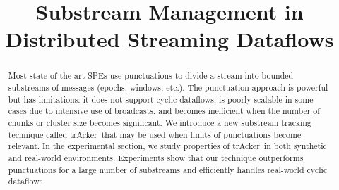 \documentclass[sigconf]{acmart}
\newcommand {\tracker} {trAcker}
\begin{document}
\title {Substream Management in Distributed Streaming Dataflows}







\begin{abstract}
Most state-of-the-art SPEs use punctuations to divide a stream into bounded substreams of messages (epochs, windows, etc.). The punctuation approach is powerful but has limitations: it does not support cyclic dataflows, is poorly scalable in some cases due to intensive use of broadcasts, and becomes inefficient when the number of chunks or cluster size becomes significant. We introduce a new substream tracking technique called \tracker\ that may be used when limits of punctuations become relevant. In the experimental section, we study properties of \tracker\ in both synthetic and real-world environments. Experiments show that our technique outperforms punctuations for a large number of substreams and efficiently handles real-world cyclic dataflows.
\end{abstract}
\end{document}
